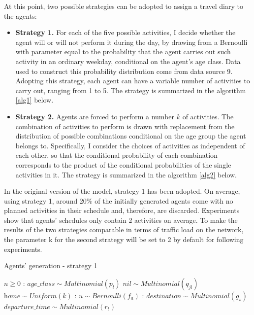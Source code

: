 At this point, two possible strategies can be adopted to assign a travel diary to the agents:
\begin{itemize}
    \item \textbf{Strategy 1.} For each of the five possible activities, I decide whether the agent will or will not perform it during the day, by drawing from a Bernoulli with parameter equal to the probability that the agent carries out such activity in an ordinary weekday, conditional on the agent's age class. Data used to construct this probability distribution come from data source 9. Adopting this strategy, each agent can have a variable number of activities to carry out, ranging from 1 to 5. The strategy is summarized in the algorithm \ref{alg1} below.
    \item \textbf{Strategy 2.} Agents are forced to perform a number $k$ of activities. The combination of activities to perform is drawn with replacement from the distribution of possible combinations conditional on the age group the agent belongs to. Specifically, I consider the choices of activities as independent of each other, so that the conditional probability of each combination corresponds to the product of the conditional probabilities of the single activities in it. The strategy is summarized in the algorithm \ref{alg2} below.
\end{itemize}
In the original version of the model, strategy 1 has been adopted. On average, using strategy 1, around $20\%$ of the initially generated agents come with no planned activities in their schedule and, therefore, are discarded. Experiments show that agents' schedules only contain 2 activities on average. To make the results of the two strategies comparable in terms of traffic load on the network, the parameter k for the second strategy will be set to 2 by default for following experiments. 

\begin{algorithm}[h!]
\caption{Agents' generation - strategy 1}\label{alg1}
\begin{algorithmic}
\Require $n \geq 0$
:
\State $\textit{age\_class} \sim Multinomial(p_l)$ 
\State $\textit{nil} \sim Multinomial(q_{jl})$ 
\State $\textit{home} \sim Uniform(k)$ 
:
\State $ \textit{u} \sim Bernoulli(f_a)$ 
:
    \State $\textit{destination} \sim Multinomial(g_s)$ \\
    \State $\textit{departure\_time} \sim Multinomial(r_t)$ \\
\EndIf
\EndFor
\EndFor
\end{algorithmic}
\end{algorithm}


